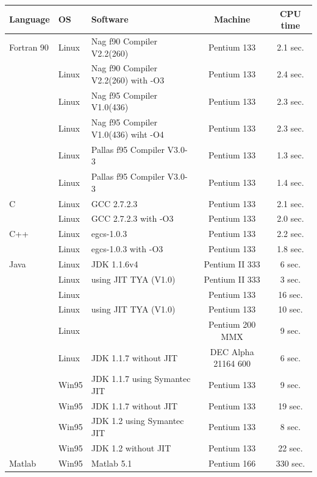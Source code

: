 \begin{table}[htbp]
  \begin{center}
    \leavevmode
    \begin{tabular}{llp{3cm}|c|c}
      Language & OS & Software & Machine & CPU time \\\hline\hline  
   Fortran 90 & Linux & Nag f90 Compiler V2.2(260) & Pentium 133 & 2.1 sec.\\
           & Linux & Nag f90 Compiler V2.2(260) with -O3 & Pentium 133 & 2.4 sec.\\
           & Linux & Nag f95 Compiler V1.0(436) & Pentium 133 & 2.3 sec.\\
           & Linux & Nag f95 Compiler V1.0(436) wiht -O4& Pentium 133 & 2.3 sec.\\
           & Linux & Pallas f95 Compiler V3.0-3 & Pentium 133 & 1.3 sec.\\
           & Linux & Pallas f95 Compiler V3.0-3 & Pentium 133 & 1.4 sec.\\\hline
   C       & Linux & GCC 2.7.2.3 & Pentium 133 & 2.1 sec. \\
           & Linux & GCC 2.7.2.3 with -O3 & Pentium 133 & 2.0 sec. \\\hline
   C++     & Linux & egcs-1.0.3 & Pentium 133 & 2.2 sec. \\
           & Linux & egcs-1.0.3 with -O3 & Pentium 133 & 1.8 sec. \\\hline
      Java & Linux & JDK 1.1.6v4 & Pentium II 333 & 6 sec. \\\hline
           & Linux & using JIT TYA (V1.0) & Pentium II 333 & 3 sec.\\
           & Linux &           & Pentium 133 & 16 sec. \\
           & Linux & using JIT TYA (V1.0) & Pentium 133 & 10 sec.\\
           & Linux &           & Pentium 200 MMX & 9 sec. \\
           & Linux & JDK 1.1.7 without JIT & DEC Alpha 21164 600 & 6 sec. \\
           & Win95 & JDK 1.1.7 using Symantec JIT & Pentium 133 & 9 sec. \\
           & Win95 & JDK 1.1.7 without JIT & Pentium 133 & 19 sec. \\
           & Win95 & JDK 1.2 using Symantec JIT & Pentium 133 & 8 sec. \\
           & Win95 & JDK 1.2 without JIT & Pentium 133 & 22 sec. \\\hline
   Matlab  & Win95 & Matlab 5.1 & Pentium 166 & 330 sec.\\

\end{tabular}
\end{center}
\end{table}
